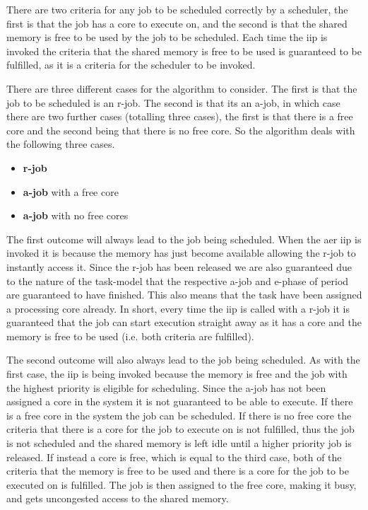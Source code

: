 \documentclass{kththesis}
\begin{document}

There are two criteria for any job to be scheduled correctly by a scheduler, the first is that the
job has a core to execute on, and the second is that the shared memory is free to be used by the job
to be scheduled. Each time the \acrshort{iip} is invoked the criteria that the shared memory is free
to be used is guaranteed to be fulfilled, as it is a criteria for the scheduler to be invoked.

There are three different cases for the algorithm to consider. The first is that the job to be
scheduled is an \acrshort{r}-job. The second is that its an \acrshort{a}-job, in which case there
are two further cases (totalling three cases), the first is that there is a free core and the second
being that there is no free core. So the algorithm deals with the following three cases.

\begin {itemize}
    \item \textbf{\acrshort{r}-job}
    \item \textbf{\acrshort{a}-job} with a free core
    \item \textbf{\acrshort{a}-job} with no free cores
\end {itemize}

The first outcome will always lead to the job being scheduled. When the \acrshort{aer}
\acrshort{iip} is invoked it is because the memory has just become available allowing the
\acrshort{r}-job to instantly access it. Since the \acrshort{r}-job has been released we are also
guaranteed due to the nature of the task-model that the respective \acrshort{a}-job and
\acrshort{e}-phase of period are guaranteed to have finished. This also means that the task have
been assigned a processing core already. In short, every time the \acrshort{iip} is called with a
\acrshort{r}-job it is guaranteed that the job can start execution straight away as it has a core
and the memory is free to be used (i.e. both criteria are fulfilled). 

The second outcome will also always lead to the job being scheduled. As with the first case, the
\acrshort{iip} is being invoked because the memory is free and the job with the highest priority is
eligible for scheduling. Since the \acrshort{a}-job has not been assigned a core in the system
it is not guaranteed to be able to execute. If there is a free core in the system the job can be
scheduled. If there is no free core the criteria that there is a core for the job to execute on is
not fulfilled, thus the job is not scheduled and the shared memory is left idle until a higher
priority job is released. If instead a core is free, which is equal to the third case, both of the
criteria that the memory is free to be used and there is a core for the job to be executed on is
fulfilled. The job is then assigned to the free core, making it busy, and gets uncongested access
to the shared memory.
\end{document}
